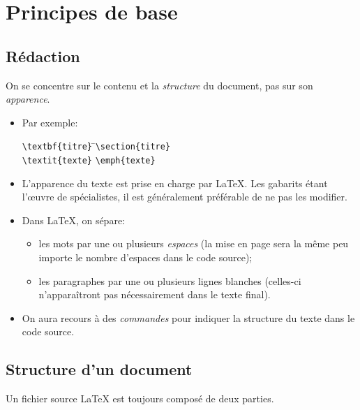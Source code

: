 \chapter{Principes de base}
\label{chap:bases}

\section{Rédaction}

On se concentre sur le contenu et la \emph{structure} du document,
pas sur son \emph{apparence}.

\begin{itemize}
\item Par exemple: \bigskip
  \begin{tabbing}
    \verb=\textbf{titre}= \qquad\= \faArrowRight \qquad\= \verb|\section{titre}| \\[6pt]
    \verb|\textit{texte}| \> \faArrowRight \> \verb|\emph{texte}|
  \end{tabbing}
  \bigskip
\item L'apparence du texte est prise en charge par {\LaTeX}. Les
  gabarits étant l'{\oe}uvre de spécialistes, il est généralement
  préférable de ne pas les modifier.
\item Dans {\LaTeX}, on sépare:
  \begin{itemize}
  \item les mots par une ou plusieurs \emph{espaces} (la mise en page
    sera la même peu importe le nombre d'espaces dans le code source);
  \item les paragraphes par une ou plusieurs lignes blanches
    (celles-ci n'apparaîtront pas nécessairement dans le texte final).
  \end{itemize}
\item On aura recours à des \emph{commandes} pour indiquer la
  structure du texte dans le code source.
\end{itemize}


\section{Structure d'un document}

Un fichier source {\LaTeX} est toujours composé de deux parties.

